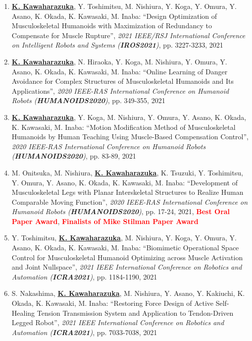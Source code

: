 \documentclass[letterpaper,11pt]{article}
\begin{document}
\begin{enumerate}
\item \underline{\textbf{K. Kawaharazuka}}, Y. Toshimitsu, M. Nishiura, Y. Koga, Y. Omura, Y. Asano, K. Okada, K. Kawasaki, M. Inaba: ``Design Optimization of Musculoskeletal Humanoids with Maximization of Redundancy to Compensate for Muscle Rupture'', \textit{2021 IEEE/RSJ International Conference on Intelligent Robots and Systems (\textit{\textbf{IROS2021}})}, pp. 3227-3233, 2021
\item \underline{\textbf{K. Kawaharazuka}}, N. Hiraoka, Y. Koga, M. Nishiura, Y. Omura, Y. Asano, K. Okada, K. Kawasaki, M. Inaba: ``Online Learning of Danger Avoidance for Complex Structures of Musculoskeletal Humanoids and Its Applications'', \textit{2020 IEEE-RAS International Conference on Humanoid Robots (\textit{\textbf{HUMANOIDS2020}})}, pp. 349-355, 2021
\item \underline{\textbf{K. Kawaharazuka}}, Y. Koga, M. Nishiura, Y. Omura, Y. Asano, K. Okada, K. Kawasaki, M. Inaba: ``Motion Modification Method of Musculoskeletal Humanoids by Human Teaching Using Muscle-Based Compensation Control'', \textit{2020 IEEE-RAS International Conference on Humanoid Robots (\textit{\textbf{HUMANOIDS2020}})}, pp. 83-89, 2021
\item M. Onitsuka, M. Nishiura, \underline{\textbf{K. Kawaharazuka}}, K. Tsuzuki, Y. Toshimitsu, Y. Omura, Y. Asano, K. Okada, K. Kawasaki, M. Inaba: ``Development of Musculoskeletal Legs with Planar Interskeletal Structures to Realize Human Comparable Moving Function'', \textit{2020 IEEE-RAS International Conference on Humanoid Robots (\textit{\textbf{HUMANOIDS2020}})}, pp. 17-24, 2021, \textbf{\textcolor{red}{Best Oral Paper Award}}, \textbf{\textcolor{red}{Finalists of Mike Stilman Paper Award}}
\item Y. Toshimitsu, \underline{\textbf{K. Kawaharazuka}}, M. Nishiura, Y. Koga, Y. Omura, Y. Asano, K. Okada, K. Kawasaki, M. Inaba: ``Biomimetic Operational Space Control for Musculoskeletal Humanoid Optimizing across Muscle Activation and Joint Nullspace'', \textit{2021 IEEE International Conference on Robotics and Automation (\textit{\textbf{ICRA2021}})}, pp. 1184-1190, 2021
\item S. Nakashima, \underline{\textbf{K. Kawaharazuka}}, M. Nishiura, Y. Asano, Y. Kakiuchi, K. Okada, K. Kawasaki, M. Inaba: ``Restoring Force Design of Active Self-Healing Tension Transmission System and Application to Tendon-Driven Legged Robot'', \textit{2021 IEEE International Conference on Robotics and Automation (\textit{\textbf{ICRA2021}})}, pp. 7033-7038, 2021

\end{enumerate}
\end{document}
